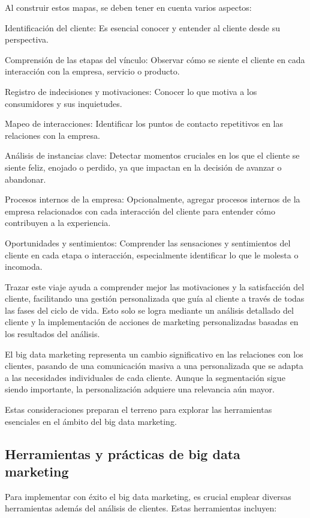 \documentclass[
    a4paper, %
    10pt, %
    unnumberedsections, %
    twoside, %
]{LTJournalArticle}
\begin{document}
Al construir estos mapas, se deben tener en cuenta varios aspectos:

Identificación del cliente: Es esencial conocer y entender al cliente desde su perspectiva.

Comprensión de las etapas del vínculo: Observar cómo se siente el cliente en cada interacción con la empresa, servicio o producto.

Registro de indecisiones y motivaciones: Conocer lo que motiva a los consumidores y sus inquietudes.

Mapeo de interacciones: Identificar los puntos de contacto repetitivos en las relaciones con la empresa.

Análisis de instancias clave: Detectar momentos cruciales en los que el cliente se siente feliz, enojado o perdido, ya que impactan en la decisión de avanzar o abandonar.

Procesos internos de la empresa: Opcionalmente, agregar procesos internos de la empresa relacionados con cada interacción del cliente para entender cómo contribuyen a la experiencia.

Oportunidades y sentimientos: Comprender las sensaciones y sentimientos del cliente en cada etapa o interacción, especialmente identificar lo que le molesta o incomoda.

Trazar este viaje ayuda a comprender mejor las motivaciones y la satisfacción del cliente, facilitando una gestión personalizada que guía al cliente a través de todas las fases del ciclo de vida. Esto solo se logra mediante un análisis detallado del cliente y la implementación de acciones de marketing personalizadas basadas en los resultados del análisis.

El big data marketing representa un cambio significativo en las relaciones con los clientes, pasando de una comunicación masiva a una personalizada que se adapta a las necesidades individuales de cada cliente. Aunque la segmentación sigue siendo importante, la personalización adquiere una relevancia aún mayor.

Estas consideraciones preparan el terreno para explorar las herramientas esenciales en el ámbito del big data marketing.



\subsection{Herramientas y prácticas de big data marketing}


Para implementar con éxito el big data marketing, es crucial emplear diversas herramientas además del análisis de clientes. Estas herramientas incluyen:
\end{document}
